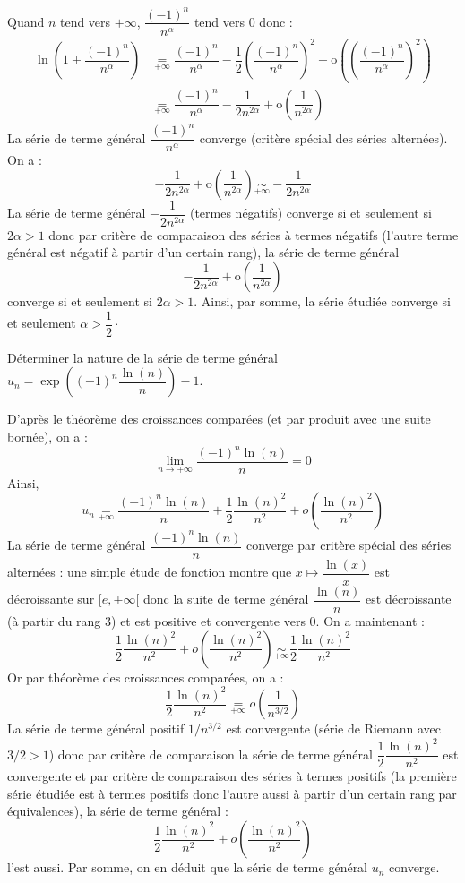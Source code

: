 \documentclass[a4paper,10pt]{report}
\begin{document}
\corr Quand $n$ tend vers $+ \infty$, $\dfrac{(-1)^n}{n^{\alpha}}$ tend vers $0$ donc :
\begin{align*}
 \ln \left( 1 + \dfrac{(-1)^n}{n^{\alpha}} \right) & \underset{+ \infty}{=} \dfrac{(-1)^n}{n^{\alpha}} - \dfrac{1}{2} \left(\dfrac{(-1)^n}{n^{\alpha}} \right)^2 + \textrm{o} \left(\left(\dfrac{(-1)^n}{n^{\alpha}} \right)^2\right) \\
 & \underset{+ \infty}{=} \dfrac{(-1)^n}{n^{\alpha}} - \dfrac{1}{2n^{2\alpha}} +  \textrm{o} \left( \dfrac{1}{n^{2 \alpha}} \right)
 \end{align*}
 La série de terme général $\dfrac{(-1)^n}{n^{\alpha}}$ converge (critère spécial des séries alternées). On a :
 $$  - \dfrac{1}{2n^{2\alpha}} +  \textrm{o} \left( \dfrac{1}{n^{2 \alpha}} \right) \underset{+\infty}{\sim}  - \dfrac{1}{2n^{2\alpha}}$$
 La série de terme général $- \dfrac{1}{2n^{2\alpha}}$ (termes négatifs) converge si et seulement si $2 \alpha>1$ donc par critère de comparaison des séries à termes négatifs (l'autre terme général est négatif à partir d'un certain rang), la série de terme général 
$$  - \dfrac{1}{2n^{2\alpha}} +  \textrm{o} \left( \dfrac{1}{n^{2 \alpha}} \right)$$
converge si et seulement si $2 \alpha>1$. Ainsi, par somme, la série étudiée converge si et seulement $\alpha > \dfrac{1}{2} \cdot$

\medskip


\begin{Exercice}{} Déterminer la nature de la série de terme général $u_n = \exp \left( (-1)^n \dfrac{\ln(n)}{n} \right)-1$.
\end{Exercice}

\corr D'après le théorème des croissances comparées (et par produit avec une suite bornée), on a :
$$ \lim_{n \rightarrow + \infty} \dfrac{(-1)^n \ln(n)}{n}=0$$
Ainsi,
$$ u_n \underset{+ \infty}{=}  \dfrac{(-1)^n \ln(n)}{n} + \dfrac{1}{2}  \dfrac{\ln(n)^2}{n^2} + o \left(  \dfrac{\ln(n)^2}{n^2} \right)$$
La série de terme général $\dfrac{(-1)^n \ln(n)}{n}$ converge par critère spécial des séries alternées : une simple étude de fonction montre que $x \mapsto \dfrac{\ln(x)}{x}$ est décroissante sur $[e, + \infty[$ donc la suite de terme général $ \dfrac{\ln(n)}{n}$ est décroissante (à partir du rang $3$) et est positive et convergente vers $0$. On a maintenant :
$$ \dfrac{1}{2}  \dfrac{\ln(n)^2}{n^2} + o \left(  \dfrac{\ln(n)^2}{n^2} \right) \underset{+ \infty}{\sim}  \dfrac{1}{2}  \dfrac{\ln(n)^2}{n^2}$$
Or par théorème des croissances comparées, on a :
$$ \dfrac{1}{2}  \dfrac{\ln(n)^2}{n^2} \underset{+ \infty}{=} o \left( \dfrac{1}{n^{3/2}}\right)$$
La série de terme général positif $1/n^{3/2}$ est convergente (série de Riemann avec $3/2>1$) donc par critère de comparaison la série de terme général $\dfrac{1}{2}  \dfrac{\ln(n)^2}{n^2}$ est convergente et par critère de comparaison des séries à termes positifs (la première série étudiée est à termes positifs donc l'autre aussi à partir d'un certain rang par équivalences), la série de terme général :
$$ \dfrac{1}{2}  \dfrac{\ln(n)^2}{n^2} + o \left(  \dfrac{\ln(n)^2}{n^2} \right) $$
l'est aussi. Par somme, on en déduit que la série de terme général $u_n$ converge.
\end{document}
